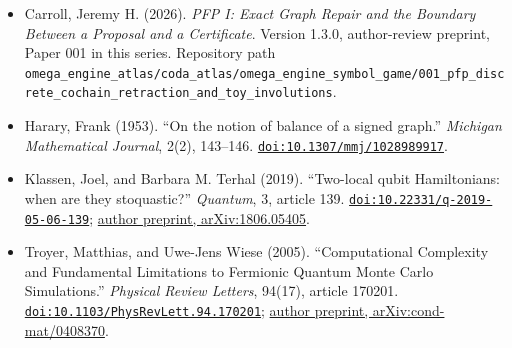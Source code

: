 \documentclass[
  11pt,
]{article}
\providecommand{\tightlist}{%
  \setlength{\itemsep}{0pt}\setlength{\parskip}{0pt}}
\begin{document}
\begin{itemize}
\tightlist
\item
  Carroll, Jeremy H. (2026). \emph{PFP I: Exact Graph Repair and the
  Boundary Between a Proposal and a Certificate}. Version 1.3.0,
  author-review preprint, Paper 001 in this series. Repository path
  \nolinkurl{omega_engine_atlas/coda_atlas/omega_engine_symbol_game/001_pfp_discrete_cochain_retraction_and_toy_involutions}.
\item
  Harary, Frank (1953). ``On the notion of balance of a signed graph.''
  \emph{Michigan Mathematical Journal}, 2(2), 143--146.
  \href{https://doi.org/10.1307/mmj/1028989917}{\nolinkurl{doi:10.1307/mmj/1028989917}}.
\item
  Klassen, Joel, and Barbara M. Terhal (2019). ``Two-local qubit
  Hamiltonians: when are they stoquastic?'' \emph{Quantum}, 3, article
  139.
  \href{https://doi.org/10.22331/q-2019-05-06-139}{\nolinkurl{doi:10.22331/q-2019-05-06-139}};
  \href{https://arxiv.org/abs/1806.05405}{author preprint,
  arXiv:1806.05405}.
\item
  Troyer, Matthias, and Uwe-Jens Wiese (2005). ``Computational
  Complexity and Fundamental Limitations to Fermionic Quantum Monte
  Carlo Simulations.'' \emph{Physical Review Letters}, 94(17), article
  170201.
  \href{https://doi.org/10.1103/PhysRevLett.94.170201}{\nolinkurl{doi:10.1103/PhysRevLett.94.170201}};
  \href{https://arxiv.org/abs/cond-mat/0408370}{author preprint,
  arXiv:cond-mat/0408370}.
\end{itemize}
\end{document}
